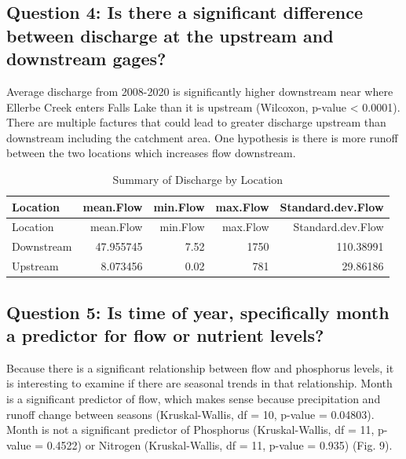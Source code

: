 \documentclass[12pt,]{article}
\begin{document}
\hypertarget{question-4-is-there-a-significant-difference-between-discharge-at-the-upstream-and-downstream-gages}{%
\subsection{Question 4: Is there a significant difference between
discharge at the upstream and downstream
gages?}\label{question-4-is-there-a-significant-difference-between-discharge-at-the-upstream-and-downstream-gages}}

Average discharge from 2008-2020 is significantly higher downstream near
where Ellerbe Creek enters Falls Lake than it is upstream (Wilcoxon,
p-value \textless{} 0.0001). There are multiple factures that could lead
to greater discharge upstream than downstream including the catchment
area. One hypothesis is there is more runoff between the two locations
which increases flow downstream.

\begin{longtable}[]{@{}lrrrr@{}}
\caption{Summary of Discharge by Location}\tabularnewline
\toprule
Location & mean.Flow & min.Flow & max.Flow &
Standard.dev.Flow\tabularnewline
\midrule
\endfirsthead
\toprule
Location & mean.Flow & min.Flow & max.Flow &
Standard.dev.Flow\tabularnewline
\midrule
\endhead
Downstream & 47.955745 & 7.52 & 1750 & 110.38991\tabularnewline
Upstream & 8.073456 & 0.02 & 781 & 29.86186\tabularnewline
\bottomrule
\end{longtable}

\hypertarget{question-5-is-time-of-year-specifically-month-a-predictor-for-flow-or-nutrient-levels}{%
\subsection{Question 5: Is time of year, specifically month a predictor
for flow or nutrient
levels?}\label{question-5-is-time-of-year-specifically-month-a-predictor-for-flow-or-nutrient-levels}}

Because there is a significant relationship between flow and phosphorus
levels, it is interesting to examine if there are seasonal trends in
that relationship. Month is a significant predictor of flow, which makes
sense because precipitation and runoff change between seasons
(Kruskal-Wallis, df = 10, p-value = 0.04803). Month is not a significant
predictor of Phosphorus (Kruskal-Wallis, df = 11, p-value = 0.4522) or
Nitrogen (Kruskal-Wallis, df = 11, p-value = 0.935) (Fig. 9).
\end{document}
